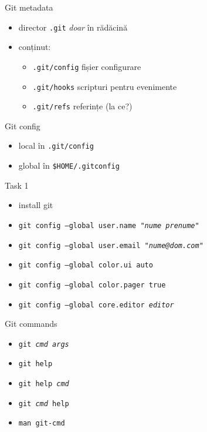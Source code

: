 \documentclass{beamer}
\begin{document}
\begin{frame}{Git metadata}
  \begin{itemize}[<+->]
    \item director \texttt{.git} \textit{doar} în rădăcină
    \item conținut:
      \begin{itemize}
        \item \texttt{.git/config} fișier configurare
        \item \texttt{.git/hooks} scripturi pentru evenimente
        \item \texttt{.git/refs} referințe (la ce?)
      \end{itemize}
  \end{itemize}
\end{frame}

\begin{frame}{Git config}
  \begin{itemize}
    \item local în \texttt{.git/config}
    \item global în \texttt{\$HOME/.gitconfig}
  \end{itemize}
  \pause
  \begin{alertblock}{Task 1}
    \begin{itemize}
      \item install git
      \item \texttt{git config --global user.name "\textit{nume prenume}"}
      \item \texttt{git config --global user.email "\textit{nume@dom.com}"}
      \item \texttt{git config --global color.ui auto}
      \item \texttt{git config --global color.pager true}
      \item \texttt{git config --global core.editor \textit{editor}}
    \end{itemize}
  \end{alertblock}
\end{frame}

\begin{frame}{Git commands}
  \begin{itemize}
    \item \texttt{git \textit{cmd args}}
    \item \texttt{git help}
    \item \texttt{git help \textit{cmd}}
    \item \texttt{git \textit{cmd} help}
    \item \texttt{man git-\texttt{cmd}}
  \end{itemize}
\end{frame}
\end{document}

